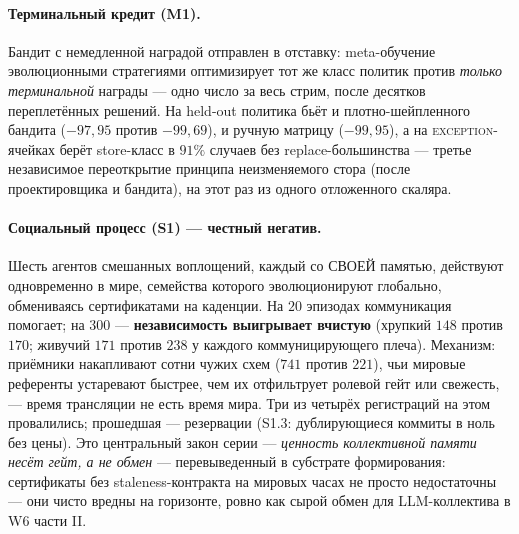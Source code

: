 \documentclass{article}
\begin{document}
\paragraph{Терминальный кредит (M1).} Бандит с немедленной наградой
отправлен в отставку: meta-обучение эволюционными стратегиями
оптимизирует тот же класс политик против \emph{только терминальной}
награды --- одно число за весь стрим, после десятков переплетённых
решений. На held-out политика бьёт и плотно-шейпленного бандита
($-97{,}95$ против $-99{,}69$), и ручную матрицу ($-99{,}95$), а на
\textsc{exception}-ячейках берёт store-класс в $91\%$ случаев без
replace-большинства --- третье независимое переоткрытие принципа
неизменяемого стора (после проектировщика и бандита), на этот раз из
одного отложенного скаляра.

\paragraph{Социальный процесс (S1) --- честный негатив.} Шесть
агентов смешанных воплощений, каждый со СВОЕЙ памятью, действуют
одновременно в мире, семейства которого эволюционируют глобально,
обмениваясь сертификатами на каденции. На $20$ эпизодах коммуникация
помогает; на $300$ --- \textbf{независимость выигрывает вчистую}
(хрупкий $148$ против $170$; живучий $171$ против $238$ у каждого
коммуницирующего плеча). Механизм: приёмники накапливают сотни чужих
схем ($741$ против $221$), чьи мировые референты устаревают быстрее,
чем их отфильтрует ролевой гейт или свежесть, --- время трансляции не
есть время мира. Три из четырёх регистраций на этом провалились;
прошедшая --- резервации (S1.3: дублирующиеся коммиты в ноль без
цены). Это центральный закон серии --- \emph{ценность коллективной
памяти несёт гейт, а не обмен} --- перевыведенный в субстрате
формирования: сертификаты без staleness-контракта на мировых часах
не просто недостаточны --- они чисто вредны на горизонте, ровно как
сырой обмен для LLM-коллектива в W6 части II.
\end{document}
